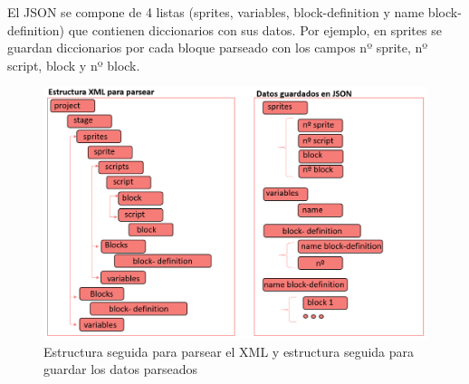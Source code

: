 \documentclass[a4paper, 12pt]{book}
\begin{document}
El JSON se compone de 4 listas (sprites, variables, block-definition y name block-definition) que contienen diccionarios con sus datos. Por ejemplo, en sprites se guardan diccionarios por cada bloque parseado con los campos nº sprite, nº script, block y nº block.
\\
\begin{figure}[h]
\centering
            \includegraphics[scale=0.52]{img/tree_xml.PNG}
            \caption{Estructura seguida para parsear el XML y estructura seguida para guardar los datos parseados}
            \label{figura:tree}
    \end{figure}
    
\end{document}
